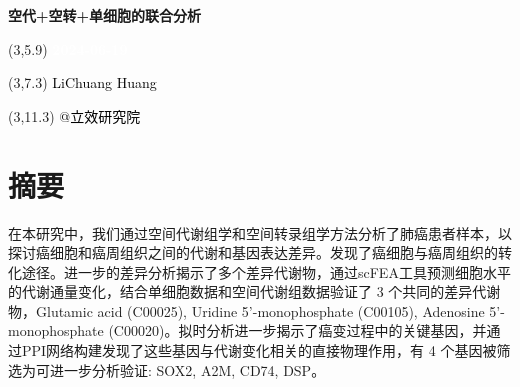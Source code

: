 \documentclass[
]{article}
\author{}
\date{\vspace{-2.5em}}
\begin{document}
\begin{titlepage} 
\begin{center} \textbf{\Huge
空代+空转+单细胞的联合分析} \vspace{4em}
\begin{textblock}{10}(3,5.9) \huge
\textbf{\textcolor{white}{2024-06-19}}
\end{textblock} \begin{textblock}{10}(3,7.3)
\Large \textcolor{black}{LiChuang Huang}
\end{textblock} \begin{textblock}{10}(3,11.3)
\Large \textcolor{black}{@立效研究院}
\end{textblock} \end{center} \end{titlepage}
\restoregeometry


\begin{center}\vspace{1.5cm}\end{center}\tableofcontents

\begin{center}\vspace{1.5cm}\end{center}\listoffigures

\begin{center}\vspace{1.5cm}\end{center}\listoftables

\newpage


\hypertarget{abstract}{%
\section{摘要}\label{abstract}}

在本研究中，我们通过空间代谢组学和空间转录组学方法分析了肺癌患者样本，以探讨癌细胞和癌周组织之间的代谢和基因表达差异。发现了癌细胞与癌周组织的转化途径。进一步的差异分析揭示了多个差异代谢物，通过scFEA工具预测细胞水平的代谢通量变化，结合单细胞数据和空间代谢组数据验证了 3 个共同的差异代谢物，Glutamic acid (C00025), Uridine 5'-monophosphate (C00105), Adenosine 5'-monophosphate (C00020)。拟时分析进一步揭示了癌变过程中的关键基因，并通过PPI网络构建发现了这些基因与代谢变化相关的直接物理作用，有 4 个基因被筛选为可进一步分析验证: SOX2, A2M, CD74, DSP。
\end{document}
